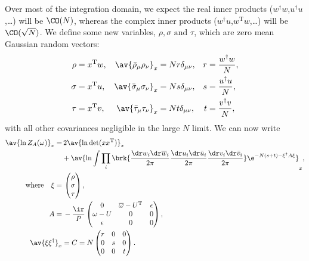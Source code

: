 \documentclass[12pt]{article}
\newcommand{\dg}{^\dagger}
\newcommand{\trans}{^\mathrm{T}}
\newcommand{\omb}{\overline{\omega}}
\newcommand{\dw}{\dr w}
\newcommand{\dwb}{\dr\overline{w}}
\newcommand{\du}{\dr u}
\newcommand{\dub}{\dr\bar{u}}
\newcommand{\dv}{\dr v}
\newcommand{\dvb}{\dr\bar{v}}
\begin{document}
Over most of the integration domain, we expect the real inner products ($w\dg w$,$u\dg u$,\ldots) will be $\CO(N)$, whereas the complex inner products ($w\dg u$,$w\trans w$,\ldots) will be $\CO(\sqrt{N})$.
We define some new variables, $\rho,\sigma \text{ and } \tau$, which are zero mean Gaussian random vectors:
%
\begin{equation}\label{eq:rstdef}
\begin{aligned}
  \rho &= x\trans w ,
    & \av{\bar{\rho}_\mu \rho_\nu}_x &= Nr\delta_{\mu\nu} ,
    & r&=\frac{w\dg w}{N}, \\
  \sigma &= x\trans u ,
    & \av{\bar{\sigma}_\mu \sigma_\nu}_x &= Ns\delta_{\mu\nu} ,
    & s&=\frac{u\dg u}{N}, \\
  \tau &= x\trans v,
    & \av{\bar{\tau}_\mu \tau_\nu}_x &= Nt\delta_{\mu\nu},
    & t&=\frac{v\dg v}{N}, \\
\end{aligned}
\end{equation}
%
with all other covariances negligible in the large $N$ limit.
We can now write
%
\begin{equation}\label{eq:potwuv}
\begin{aligned}
  \av{\ln Z_A(\omega)}_x =&\,  2\av{\ln\det(xx\trans)}_x
  \\&+
          \av{\ln\int \prod_i\brk{ \frac{\dw_i\dwb_i}{2\pi} \frac{\du_i\dub_i}{2\pi} \frac{\dv_i\dvb_i}{2\pi} } \e^{-N(s+t)-\xi\dg A \xi} }_{x} ,
  \\ \text{where}\quad
  \xi =&\, \begin{pmatrix}
           \rho \\
           \sigma \\
           \tau \\
         \end{pmatrix},
 \\
  A =&\, -\frac{\ir}{P}
       \begin{pmatrix}
         0        & \omb-U\trans & \epsilon \\
         \omega-U & 0            & 0 \\
         \epsilon & 0            & 0 \\
       \end{pmatrix},\\
  \av{\xi\xi\dg}_x &=  C = N\begin{pmatrix}
         r & 0 & 0 \\
         0 & s & 0 \\
         0 & 0 & t \\
       \end{pmatrix}.
\end{aligned}
\end{equation}
\end{document}
